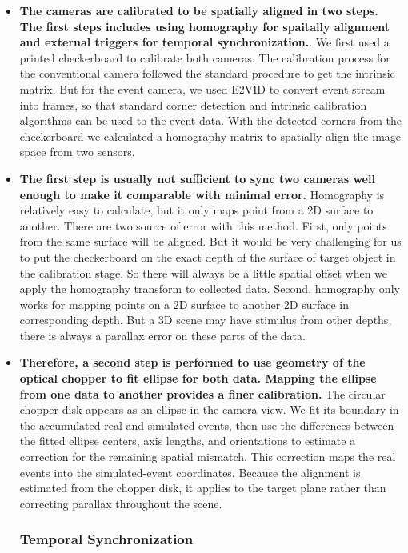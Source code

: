 \begin{itemize}
  \item \textbf{The cameras are calibrated to be spatially aligned in two steps. The first steps includes using homography for spaitally alignment and external triggers for temporal synchronization.}. We first used a printed checkerboard to calibrate both cameras. The calibration process for the conventional camera followed the standard procedure to get the intrinsic matrix. But for the event camera, we used E2VID to convert event stream into frames, so that standard corner detection and intrinsic calibration algorithms can be used to the event data. With the detected corners from  the checkerboard we calculated a homography matrix to spatially align the image space from two sensors. 

  \item \textbf{The first step is usually not sufficient to sync two cameras well enough to make it comparable with minimal error.} Homography is relatively easy to calculate, but it only maps point from a 2D surface to another. There are two source of error with this method. First, only points from the same surface will be aligned. But it would be very challenging for us to put the checkerboard on the exact depth of the surface of target object in the calibration stage. So there will always be a little spatial offset when we apply the homography transform to collected data. Second, homography only works for mapping points on a 2D surface to another 2D surface in corresponding depth. But a 3D scene may have stimulus from other depths, there is always a parallax error on these parts of the data.   

  \item \textbf{Therefore, a second step is performed to use geometry of the optical chopper to fit ellipse for both data. Mapping the ellipse from one data to another provides a finer calibration.} The circular chopper disk appears as an ellipse in the camera view. We fit its boundary in the accumulated real and simulated events, then use the differences between the fitted ellipse centers, axis lengths, and orientations to estimate a correction for the remaining spatial mismatch. This correction maps the real events into the simulated-event coordinates. Because the alignment is estimated from the chopper disk, it applies to the target plane rather than correcting parallax throughout the scene.

\subsubsection{Temporal Synchronization}


\end{itemize}

